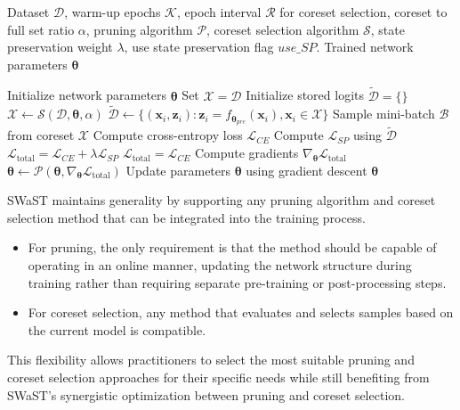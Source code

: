 \begin{algorithm}[!h]  
\caption{SWaST}  
\label{alg:mechanism}  
\begin{algorithmic}[1]  
\Require  Dataset $\mathcal{D}$, warm-up epochs $\mathcal{K}$, epoch interval $\mathcal{R}$ for coreset selection, coreset to full set ratio $\alpha$, pruning algorithm $\mathcal{P}$, coreset selection algorithm $\mathcal{S}$, state preservation weight $\lambda$, use state preservation flag $use\_SP$.  
\Ensure Trained network parameters $\boldsymbol{\theta}$  

\State Initialize network parameters $\boldsymbol{\theta}$  
\State Set $\mathcal{X} = \mathcal{D}$  
\State Initialize stored logits $\tilde{\mathcal{D}} = \{\}$  
        \State $\mathcal{X} \gets \mathcal{S}(\mathcal{D}, \boldsymbol{\theta}, \alpha)$ 
            \State $\tilde{\mathcal{D}} \gets \{(\mathbf{x}_i, \mathbf{z}_i):
\mathbf{z}_i = f_{\boldsymbol{\theta}_{\textit{pre}}}(\mathbf{x}_i),  \mathbf{x}_i \in \mathcal{X} \}$
        \EndIf
    \EndIf  
        \State Sample mini-batch $\mathcal{B}$ from coreset $\mathcal{X}$  
        \State Compute cross-entropy loss $\mathcal{L}_{CE}$  
            \State Compute $\mathcal{L}_{SP}$ using $\tilde{\mathcal{D}}$   
            \State $\mathcal{L}_{\text{total}} = \mathcal{L}_{CE} + \lambda\mathcal{L}_{SP}$  
        \Else  
            \State $\mathcal{L}_{\text{total}} = \mathcal{L}_{CE}$  
        \EndIf  
        \State Compute gradients $\nabla_{\boldsymbol{\theta}} \mathcal{L}_{\text{total}}$   
        \State $\boldsymbol{\theta} \gets \mathcal{P}(\boldsymbol{\theta}, \nabla_{\boldsymbol{\theta}} \mathcal{L}_{\text{total}})$    
        \State Update parameters $\boldsymbol{\theta}$ using gradient descent  
    \EndFor  
\EndFor  
\State \Return $\boldsymbol{\theta}$  
\end{algorithmic}  
\end{algorithm}

\begin{remark}
    SWaST maintains generality by supporting any pruning algorithm and coreset selection method that can be integrated into the training process. 
    \begin{itemize}
        \item For pruning, the only requirement is that the method should be capable of operating in an online manner, updating the network structure during training rather than requiring separate pre-training or post-processing steps.
        \item For coreset selection, any method that evaluates and selects samples based on the current model is compatible.
    \end{itemize} 
    This flexibility allows practitioners to select the most suitable pruning and coreset selection approaches for their specific needs while still benefiting from SWaST's synergistic optimization between pruning and coreset selection.
\end{remark}

